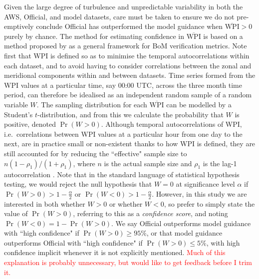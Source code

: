\documentclass{ametsoc}
\DeclareMathOperator{\pr}{Pr}
\begin{document}
Given the large degree of turbulence and unpredictable variability in both the AWS, Official, and model datasets, care must be taken to ensure we do not pre-emptively conclude Official has outperformed the model guidance when $\overline{\text{WPI}}>0$ purely by chance. The method for estimating confidence in $\overline{\text{WPI}}$ is based on a method proposed by \citet{griffiths17} as a general framework for BoM verification metrics. Note first that WPI is defined so as to minimise the temporal autocorrelations within each dataset, and to avoid having to consider correlations between the zonal and meridional components within and between datasets. Time series formed from the WPI values at a particular time, say 00:00 UTC, across the three month time period, can therefore be idealised as an independent random sample of a random variable $W$. The sampling distribution for each $\overline{\text{WPI}}$ can be modelled by a Student's $t$-distribution, and from this we calculate the probability that $W$ is positive, denoted $\pr\left(W > 0\right)$. Although temporal autocorrelations of WPI, i.e.~correlations between WPI values at a particular hour from one day to the next, are in practice small or non-existent thanks to how WPI is defined, they are still accounted for by reducing the ``effective" sample size to $ n \left(1-\rho_1\right)/\left(1+\rho_1\right)$, where $n$ is the actual sample size and $\rho_1$ is the lag-1 autocorrelation \citep{zwiers95,wilks11}. Note that in the standard language of statistical hypothesis testing, we would reject the null hypothesis that $W=0$ at significance level $\alpha$ if $\pr(W>0) > 1-\frac{\alpha}{2}$ or $\pr(W<0) > 1-\frac{\alpha}{2}$. However, in this study we are interested in both whether $W>0$ or whether $W<0$, so prefer to simply state the value of $\pr(W>0)$, referring to this as a \textit{confidence score}, and noting $\pr(W<0) = 1- \pr(W>0)$. We say Official outperforms model guidance with ``high confidence" if $\pr(W>0) \geq 95\%$, or that model guidance outperforms Official with ``high confidence" if $\pr(W>0) \leq 5\%$, with high confidence implicit whenever it is not explicitly mentioned. \textcolor{red}{Much of this explanation is probably unnecessary, but would like to get feedback before I trim it.}
\end{document}
